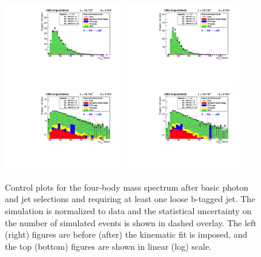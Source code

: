 \begin{figure}[ht]
 \begin{center}
   \includegraphics[width=0.45\textwidth]{figures/selection/TotalMass_ShapeNormalized_sys.pdf}
   \includegraphics[width=0.45\textwidth]{figures/selection/TotalMassKinFit_ShapeNormalized_sys.pdf}
   \includegraphics[width=0.45\textwidth]{figures/selection/TotalMass_ShapeNormalized_Log_sys.pdf}
   \includegraphics[width=0.45\textwidth]{figures/selection/TotalMassKinFit_ShapeNormalized_Log_sys.pdf}
 \end{center}
\caption{Control plots for the four-body mass spectrum after basic photon and jet selections
and requiring at least one loose b-tagged jet. The simulation is normalized to data and
the statistical uncertainty on the number of simulated events is shown in dashed overlay.
The left (right) figures are before (after) the kinematic fit is imposed, and
the top (bottom) figures are shown in linear (log) scale.}
\label{fig:mggjj_controlplot}
\end{figure}

